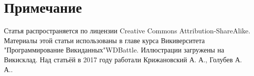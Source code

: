 \section{Примечание}

Статья распространяется по лицензии Creative Commons Attribution-ShareAlike. Материалы этой статьи использованы в главе курса Викиверситета "Программирование Викиданных"{WDBattle}. Иллюстрации загружены на Викисклад. Над статьёй в 2017 году работали Крижановский А. А., Голубев А. А..